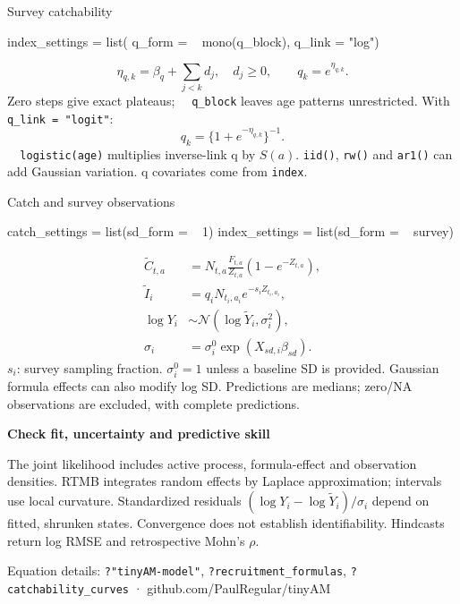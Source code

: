 \documentclass[
  9pt,
  landscape]{extarticle}
\newcommand{\smallkey}[1]{{\color{black}\bfseries #1}}
\newcommand{\micro}[1]{{\fontsize{7.0}{9.0}\selectfont #1}}
\newcommand{\pagefooter}[1]{%
  \par\vspace{1mm}\noindent
  {\color{tamgrey}\fontsize{6.8}{8}\selectfont #1}\par
}
\begin{document}
\begin{minipage}[t]{.325\linewidth}\vspace{0pt}
\begin{mathbox}{Survey catchability}
\begin{rcode}
index_settings = list(
  q_form = ~ mono(q_block), q_link = "log")
\end{rcode}
\[
\eta_{q,k}=\beta_q+\sum_{j<k}d_j,\quad d_j\ge0,
\qquad q_k=e^{\eta_{q,k}}.
\]
\micro{Zero steps give exact plateaus; \texttt{\string~ q\_block} leaves age patterns unrestricted. With \texttt{q\_link = "logit"}:}
\[
q_k=\{1+e^{-\eta_{q,k}}\}^{-1}.
\]
\micro{\texttt{\string~ logistic(age)} multiplies inverse-link q by $S(a)$. \texttt{iid()}, \texttt{rw()} and \texttt{ar1()} can add Gaussian variation. q covariates come from \texttt{index}.}
\end{mathbox}\vspace{2mm}
\begin{mathbox}{Catch and survey observations}
\begin{rcode}
catch_settings = list(sd_form = ~ 1)
index_settings = list(sd_form = ~ survey)
\end{rcode}
\[
\begin{aligned}
\widetilde C_{t,a}&=N_{t,a}\frac{F_{t,a}}{Z_{t,a}}(1-e^{-Z_{t,a}}),\\
\widetilde I_i&=q_iN_{t_i,a_i}e^{-s_iZ_{t_i,a_i}},\\
\log Y_i&\sim\mathcal N(\log\widetilde Y_i,\sigma_i^2),\\
\sigma_i&=\sigma_i^0\exp(X_{sd,i}\beta_{sd}).
\end{aligned}
\]
\micro{$s_i$: survey sampling fraction. $\sigma_i^0=1$ unless a baseline SD is provided. Gaussian formula effects can also modify log SD. Predictions are medians; zero/NA observations are excluded, with complete predictions.}
\end{mathbox}\vspace{2mm}
\smallkey{Check fit, uncertainty and predictive skill}\par\vspace{1mm}
\micro{The joint likelihood includes active process, formula-effect and observation densities. RTMB integrates random effects by Laplace approximation; intervals use local curvature. Standardized residuals $(\log Y_i-\log\widetilde Y_i)/\sigma_i$ depend on fitted, shrunken states. Convergence does not establish identifiability. Hindcasts return log RMSE and retrospective Mohn's $\rho$.}
\end{minipage}
\pagefooter{Equation details: \texttt{?\string"tinyAM-model\string"}, \texttt{?recruitment\_formulas}, \texttt{?catchability\_curves} · github.com/PaulRegular/tinyAM}
\end{document}

